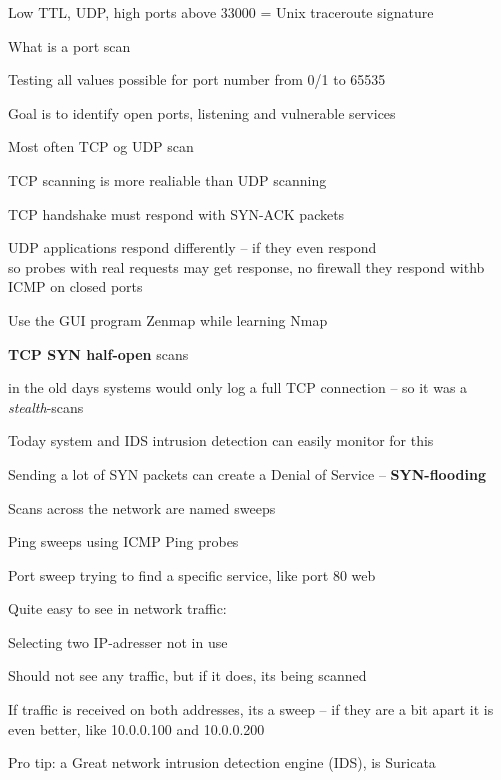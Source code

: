 \documentclass[Screen16to9,17pt]{foils}
\begin{document}
\vskip 5mm
\centerline{Low TTL, UDP, high ports above 33000 = Unix traceroute signature}


\begin{list1}
\item What is a port scan
\item Testing all values possible for port number from 0/1 to 65535
\item Goal is to identify open ports, listening and vulnerable services
\item Most often TCP og UDP scan
\item TCP scanning is more realiable than UDP scanning
\item TCP handshake must respond with SYN-ACK packets
\item UDP applications respond differently -- if they even respond\\
so probes with real requests may get response, no firewall they respond withb ICMP on closed ports
\item Use the GUI program Zenmap while learning Nmap
\end{list1}



\begin{list2}
\item {\bfseries TCP SYN half-open} scans
\item in the old days systems would only log a full TCP connection
  -- so it was a \emph{stealth}-scans
\item Today system and IDS intrusion detection can easily monitor for this
\item Sending a lot of SYN packets can create a Denial of Service -- {\bfseries SYN-flooding}
\end{list2}






\begin{list1}
\item Scans across the network are named sweeps
\item Ping sweeps using ICMP Ping probes
\item Port sweep trying to find a specific service, like port 80 web
\item Quite easy to see in network traffic:
\begin{list2}
\item Selecting two IP-adresser not in use
\item Should not see any traffic, but if it does, its being scanned
\item If traffic is received on both addresses, its a sweep -- if they are a bit apart it is even better, like 10.0.0.100 and 10.0.0.200
  \end{list2}

\vskip 2cm
Pro tip: a Great network intrusion detection engine (IDS), is Suricata 
\end{list1}
\end{document}
